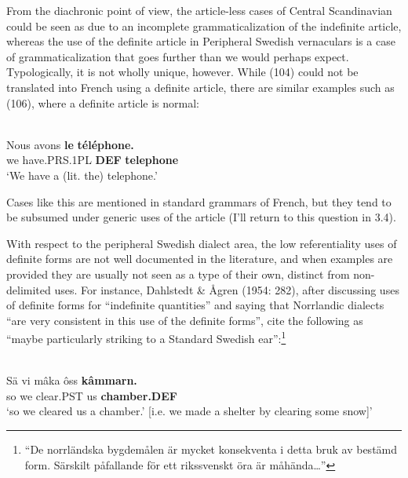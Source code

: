 
From the diachronic point of view, the article-less cases of Central Scandinavian could be seen as due to an incomplete grammaticalization of the indefinite article, whereas the use of the definite article in Peripheral Swedish vernaculars is a case of grammaticalization that goes further than we would perhaps expect. Typologically, it is not wholly unique, however. While (104) could not be translated into French using a definite article, there are similar examples such as (106), where a definite article is normal:


\ea \label{} 
\\
\gll Nous  avons  \textbf{le} \textbf{téléphone.}\\
we  have.PRS.1PL  \textbf{DEF} \textbf{telephone}\\
\glt ‘We have a (lit. the) telephone.’

\z

Cases like this are mentioned in standard grammars of French, but they tend to be subsumed under generic uses of the article (I’ll return to this question in 3.4). 


With respect to the peripheral Swedish dialect area, the low referentiality uses of definite forms are not well documented in the literature, and when examples are provided they are usually not seen as a type of their own, distinct from non-delimited uses. For instance, Dahlstedt \& Ågren (1954: 282), after discussing uses of definite forms for “indefinite quantities” and saying that Norrlandic dialects “are very consistent in this use of the definite forms”, cite the following as “maybe particularly striking to a Standard Swedish ear”:\footnote{ “De norrländska bygdemålen är mycket konsekventa i detta bruk av bestämd form. Särskilt påfallande för ett rikssvenskt öra är måhända…”} 


\ea \label{} 
\\
\gll Sä  vi  mâka  ôss  \textbf{kâmmarn.}\\
so  we  clear.PST  us  \textbf{chamber.DEF}\\
\glt ‘so we cleared us a chamber.’ [i.e. we made a shelter by clearing some snow]’


